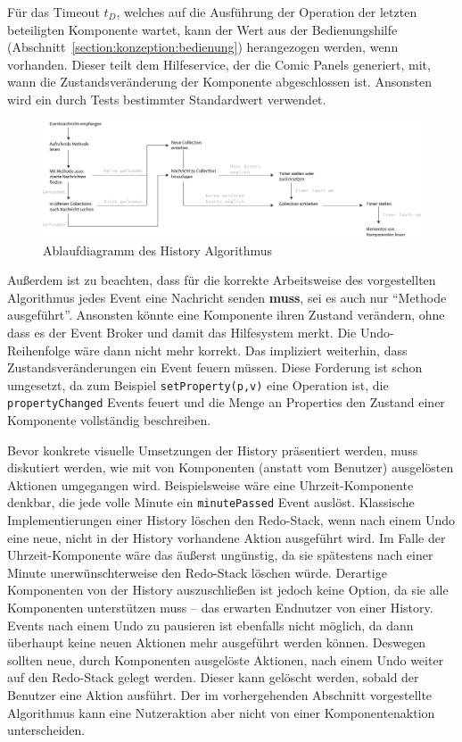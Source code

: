 \documentclass[
	headsepline,
	footsepline,
	fontsize=12pt,
	bibliography=totoc
]{scrbook}
\begin{document}
Für das Timeout $t_D$, welches auf die Ausführung der Operation der letzten beteiligten Komponente wartet, kann der Wert aus der Bedienungshilfe (Abschnitt~\ref{section:konzeption:bedienung}) herangezogen werden, wenn vorhanden. Dieser teilt dem Hilfeservice, der die Comic Panels generiert, mit, wann die Zustandsveränderung der Komponente abgeschlossen ist. Ansonsten wird ein durch Tests bestimmter Standardwert verwendet.

\begin{figure}[htbp]
   \centering
   \includegraphics[width=\textwidth]{images/konzeption-dependency-graph-diagram.png}
   \caption{Ablaufdiagramm des History Algorithmus}
   \label{figure:dependency-graph-diagram}
\end{figure}

Außerdem ist zu beachten, dass für die korrekte Arbeitsweise des vorgestellten Algorithmus jedes Event eine Nachricht senden \textbf{muss}, sei es auch nur \enquote{Methode ausgeführt}. Ansonsten könnte eine Komponente ihren Zustand verändern, ohne dass es der Event Broker und damit das Hilfesystem merkt. Die Undo-Reihenfolge wäre dann nicht mehr korrekt. Das impliziert weiterhin, dass Zustandsveränderungen ein Event feuern müssen. Diese Forderung ist schon umgesetzt, da zum Beispiel \texttt{setProperty(p,v)} eine Operation ist, die \texttt{propertyChanged} Events feuert und die Menge an Properties den Zustand einer Komponente vollständig beschreiben.


Bevor konkrete visuelle Umsetzungen der History präsentiert werden, muss diskutiert werden, wie mit von Komponenten (anstatt vom Benutzer) ausgelösten Aktionen umgegangen wird. Beispielsweise wäre eine Uhrzeit-Komponente denkbar, die jede volle Minute ein \texttt{minutePassed} Event auslöst. Klassische Implementierungen einer History löschen den Redo-Stack, wenn nach einem Undo eine neue, nicht in der History vorhandene Aktion ausgeführt wird. Im Falle der Uhrzeit-Komponente wäre das äußerst ungünstig, da sie spätestens nach einer Minute unerwünschterweise den Redo-Stack löschen würde. Derartige Komponenten von der History auszuschließen ist jedoch keine Option, da sie alle Komponenten unterstützen muss -- das erwarten Endnutzer von einer History. Events nach einem Undo zu pausieren ist ebenfalls nicht möglich, da dann überhaupt keine neuen Aktionen mehr ausgeführt werden können. Deswegen sollten neue, durch Komponenten ausgelöste Aktionen, nach einem Undo weiter auf den Redo-Stack gelegt werden. Dieser kann gelöscht werden, sobald der Benutzer eine Aktion ausführt. Der im vorhergehenden Abschnitt vorgestellte Algorithmus kann eine Nutzeraktion aber nicht von einer Komponentenaktion unterscheiden.
\end{document}
